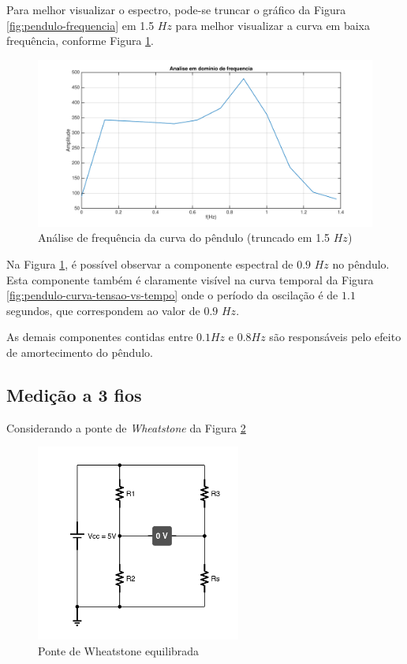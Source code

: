 \documentclass[a4paper]{instrumentacao}
\begin{document}
Para melhor visualizar o espectro, pode-se truncar o gráfico da Figura \ref{fig:pendulo-frequencia} em 1.5 $Hz$ para melhor visualizar a curva em baixa frequência, conforme Figura \ref{fig:pendulo-frequencia-truncado}.

\begin{figure}[H]
\centering
\includegraphics[width=\textwidth]{frequency-plot-slice.pdf}
\caption{Análise de frequência da curva do pêndulo (truncado em 1.5 $Hz$)}
\label{fig:pendulo-frequencia-truncado}
\end{figure}

Na Figura \ref{fig:pendulo-frequencia-truncado}, é possível observar a componente espectral de $0.9$ $Hz$ no pêndulo. Esta componente também é claramente visível na curva temporal da Figura \ref{fig:pendulo-curva-tensao-vs-tempo} onde o período da oscilação é de $1.1$ segundos, que correspondem ao valor de $0.9$ $Hz$.

As demais componentes contidas entre $0.1 Hz$ e $0.8 Hz$ são responsáveis pelo efeito de amortecimento do pêndulo.

\subsection{Medição a 3 fios}

Considerando a ponte de \textit{Wheatstone} da Figura \ref{fig:3fios-wheatstone}

\begin{figure}[H]
\centering
\includegraphics[width=0.6\textwidth]{Wheatstone-Bridge.pdf}
\caption{Ponte de Wheatstone equilibrada}
\label{fig:3fios-wheatstone}
\end{figure}
\end{document}
